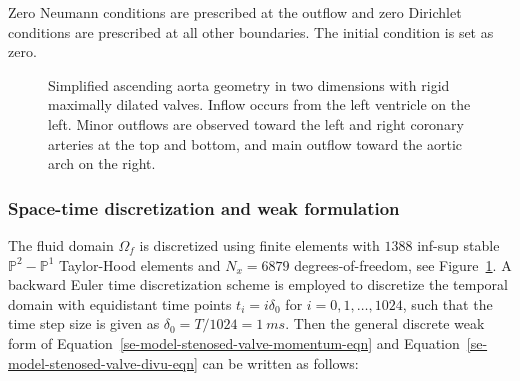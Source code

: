 \documentclass[3p]{elsarticle}
\begin{document}
Zero Neumann conditions are prescribed at the outflow and zero Dirichlet conditions
are prescribed at all other boundaries.
The initial condition is set as zero.
\begin{figure}[ht!]
    \centering
{}
    \caption{Simplified ascending aorta geometry
        in two dimensions with rigid maximally dilated valves.
        Inflow occurs from the left ventricle on the left.
        Minor outflows are observed toward the left and right coronary arteries at the top and bottom,
        and main outflow toward the aortic arch on the right.}
    \label{stenosed-valve-geometry-fig}
\end{figure}
\subsubsection{Space-time discretization and weak formulation}
\label{stenosed-valve-space-time-discretization-sec}
The fluid domain $\Omega_f$ is discretized
using finite elements with $1388$ inf-sup stable $\mathbb{P}^2-\mathbb{P}^1$
Taylor-Hood elements and $N_x = 6879$ degrees-of-freedom, see Figure~\ref{stenosed-valve-geometry-fig}.
A backward Euler time discretization scheme is employed to discretize the temporal domain
with equidistant time points $t_i = i \delta_0$ for $i = 0, 1, \ldots, 1024$,
such that the time step size is given as $\delta_0 = T / 1024 = 1~ms$.
Then the general discrete weak form of Equation~\eqref{se-model-stenosed-valve-momentum-eqn}
and Equation~\eqref{se-model-stenosed-valve-divu-eqn} can be written as follows:
\end{document}
